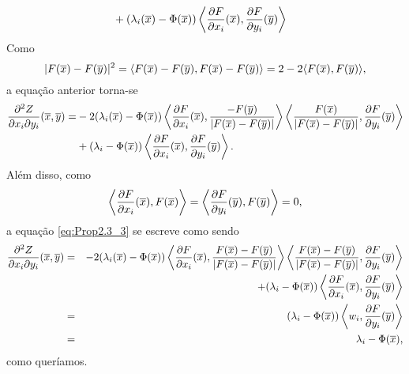 \begin{demonstracao}
\begin{eqnarray*}
\begin{aligned}
&+ 
(\lambda_i(\overline{x}) - \Phi(\overline{x})) \left\langle \frac{\partial F}{\partial x_i}(\overline{x}), \frac{\partial F}{\partial y_i}(\overline{y}) \right\rangle
\end{aligned}
\end{eqnarray*}	
Como 
\[
|F(\overline{x}) - F(\overline{y})|^2 = \langle F(\overline{x}) - F(\overline{y}), F(\overline{x}) - F(\overline{y}) \rangle = 
2 - 2 \langle F(\overline{x}), F(\overline{y}) \rangle,
\]
a equa\c c\~ao anterior torna-se
\begin{eqnarray} \label{eq:Prop2.3_3}
\begin{aligned}
\frac{\partial^2 Z}{\partial x_i \partial y_i}(\overline{x},\overline{y}) = & 
-2 (\lambda_i(\overline{x}) - \Phi(\overline{x})) \left\langle \frac{\partial F}{\partial x_i}(\overline{x}), 
\frac{-F(\overline{y})}{|F(\overline{x}) - F(\overline{y})|} \right\rangle \left\langle \frac{F(\overline{x})}{|F(\overline{x}) - 
F(\overline{y})|}, \frac{\partial F}{\partial y_i}(\overline{y}) \right\rangle \\
& + 
(\lambda_i - \Phi(\overline{x})) \left\langle \frac{\partial F}{\partial x_i}(\overline{x}), 
\frac{\partial F}{\partial y_i}(\overline{y}) \right\rangle.
\end{aligned}
\end{eqnarray}	
Al\'em disso, como
\[
\left\langle \frac{\partial F}{\partial x_i}(\overline{x}), F(\overline{x}) \right\rangle = 
\left\langle \frac{\partial F}{\partial y_i}(\overline{y}), F(\overline{y}) \right\rangle = 0,
\]
a equação \eqref{eq:Prop2.3_3} se escreve como sendo
\begin{eqnarray*}
\frac{\partial^2 Z}{\partial x_i \partial y_i}(\overline{x},\overline{y}) & = &
-2 (\lambda_i(\overline{x}) - \Phi(\overline{x})) \left\langle \frac{\partial F}{\partial x_i}(\overline{x}), \frac{F(\overline{x}) -F(\overline{y})}{|F(\overline{x}) - F(\overline{y})|} \right\rangle \left\langle 
\frac{F(\overline{x}) - F(\overline{y})}{|F(\overline{x}) - F(\overline{y})|}, \frac{\partial F}{\partial y_i}(\overline{y}) 
\right\rangle \\
&& + 
(\lambda_i - \Phi(\overline{x})) \left\langle \frac{\partial F}{\partial x_i}(\overline{x}), 
\frac{\partial F}{\partial y_i}(\overline{y}) \right\rangle \\
&= &
(\lambda_i - \Phi(\overline{x})) \left\langle w_i,\frac{\partial F}{\partial y_i}(\overline{y})
\right\rangle \\
&= & \lambda_i - \Phi(\overline{x}),
\end{eqnarray*}	
como quer\'iamos.
\end{demonstracao}


